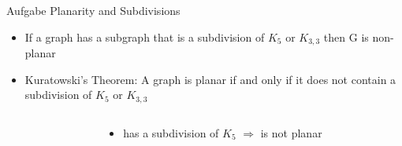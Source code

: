 \begin{frame}[allowframebreaks]{Aufgabe \thesection}{\small Planarity and Subdivisions}
\begin{requirements}
\begin{itemize}
        \begin{itemize}
          \item is a graph obtained from a graph H by successive edge subdivisions
          \item i.e. a graph obtained from H by replacing edges with pairwise internally disjoint paths
        \end{itemize}
      \item If a graph has a subgraph that is a subdivision of $K_5$ or $K_{3,3}$ then G is \alert{non-planar}
      \item \alert{Kuratowski’s Theorem:} A graph is \alert{planar} if and only if it does not contain a subdivision of $K_5$ or $K_{3,3}$
    \end{itemize}
  \end{requirements}
  \begin{solution}
  \end{solution}
  \begin{solution}
  \end{solution}
  \begin{solution}
    \begin{columns}
      \begin{column}{0.6\textwidth}
      \end{column}
      \begin{column}{0.4\textwidth}
        \begin{itemize}
          \item has a subdivision of $K_5$ $\Rightarrow$ is not planar
        \end{itemize}
      \end{column}
    \end{columns}
  \end{solution}
\end{frame}
